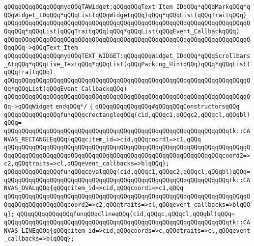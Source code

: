 \verb|qQQqqQQqqQQqqQQqmyqQQqTAWidget:qQQqqQQqText_Item_IDqQQq*qQQqMarkqQQq*qQQqWidget_IDqQQq*qQQqList(qQQqWidgetqQQq)qQQq*qQQqList(qQQqTraitqQQq)|\newline
\verb|qQQqqQQqqQQqqQQqqQQqqQQqqQQqqQQqqQQqqQQqqQQqqQQqqQQqqQQqqQQqqQQqqQQqqQQqqQQq*qQQqList(qQQqTraitqQQq)qQQq*qQQqList(qQQqEvent_CallbackqQQq)|\newline
\verb|qQQqqQQqqQQqqQQqqQQqqQQqqQQqqQQqqQQqqQQqqQQqqQQqqQQqqQQqqQQqqQQqqQQqqQQqqQQq->qQQqText_Item|\newline
\verb|qQQqqQQqqQQqqQQqmyqQQqTEXT_WIDGET:qQQqqQQqWidget_IDqQQq*qQQqScrollbars_AtqQQq*qQQqLive_TextqQQq*qQQqList(qQQqPacking_HintqQQq)qQQq*qQQqList(qQQqTraitqQQq)|\newline
\verb|qQQqqQQqqQQqqQQqqQQqqQQqqQQqqQQqqQQqqQQqqQQqqQQqqQQqqQQqqQQqqQQqqQQqqQQq*qQQqList(qQQqEvent_CallbackqQQq)|\newline
\verb|qQQqqQQqqQQqqQQqqQQqqQQqqQQqqQQqqQQqqQQqqQQqqQQqqQQqqQQqqQQqqQQqqQQqqQQq->qQQqWidget|\newline
\verb|endqQQq*/|\newline
\verb|{|\newline
\newline
\verb|qQQqqQQqqQQqqQQq#qQQqqQQqConstructorsqQQq|\newline
\newline
\verb|qQQqqQQqqQQqqQQqfunqQQqcrectangleqQQq(cid,qQQqc1,qQQqc2,qQQqcl,qQQqbl)qQQq=|\newline
\verb|qQQqqQQqqQQqqQQqqQQqqQQqqQQqqQQqqQQqqQQqqQQqqQQqqQQqqQQqqQQqqQQqtk::CANVAS_RECTANGLEqQQq{qQQqcitem_id=>cid,qQQqcoord1=>c1,qQQq|\newline
\verb|qQQqqQQqqQQqqQQqqQQqqQQqqQQqqQQqqQQqqQQqqQQqqQQqqQQqqQQqqQQqqQQqqQQqqQQqqQQqqQQqqQQqqQQqqQQqqQQqqQQqqQQqqQQqqQQqqQQqqQQqqQQqqQQqqQQqcoord2=>c2,qQQqtraits=>cl,qQQqevent_callbacks=>blqQQq};|\newline
\verb|qQQqqQQqqQQqqQQqfunqQQqcovalqQQq(cid,qQQqc1,qQQqc2,qQQqcl,qQQqbl)qQQq=|\newline
\verb|qQQqqQQqqQQqqQQqqQQqqQQqqQQqqQQqqQQqqQQqqQQqqQQqqQQqqQQqqQQqqQQqtk::CANVAS_OVALqQQq{qQQqcitem_id=>cid,qQQqcoord1=>c1,qQQq|\newline
\verb|qQQqqQQqqQQqqQQqqQQqqQQqqQQqqQQqqQQqqQQqqQQqqQQqqQQqqQQqqQQqqQQqqQQqqQQqqQQqqQQqqQQqqQQqcoord2=>c2,qQQqtraits=>cl,qQQqevent_callbacks=>blqQQq};|\newline
\verb|qQQqqQQqqQQqqQQqfunqQQqclineqQQq(cid,qQQqc,qQQqcl,qQQqbl)qQQq=|\newline
\verb|qQQqqQQqqQQqqQQqqQQqqQQqqQQqqQQqqQQqqQQqqQQqqQQqqQQqqQQqqQQqqQQqtk::CANVAS_LINEqQQq{qQQqcitem_id=>cid,qQQqcoords=>c,qQQqtraits=>cl,qQQqevent_callbacks=>blqQQq};|\newline
